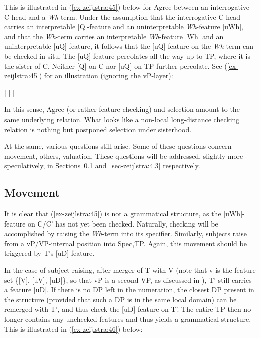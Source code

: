 \documentclass[output=paper
,modfonts
,nonflat]{langsci/langscibook}
\begin{document}
This is illustrated in (\ref{ex-zeijlstra:45}) below for Agree between an interrogative C-head and a \textit{Wh}{}-term. Under the assumption that the interrogative C-head carries an interpretable [Q]-feature and an uninterpretable \textit{Wh}-feature [uWh], and that the \textit{Wh}{}-term carries an interpretable \textit{Wh}-feature [Wh] and an uninterpretable [uQ]-feature, it follows that the [uQ]-feature on the \textit{Wh}-term can be checked in situ. The [uQ]-feature percolates all the way up to TP, where it is the sister of C. Neither [Q] on C nor [uQ] on TP further percolate. See (\ref{ex-zeijlstra:45}) for an illustration (ignoring the vP-layer):

\begin{exe}
\ex\label{ex-zeijlstra:45}\small
		\begin{forest}
		       [C{'}{=}\{{[}C{]}{,} {[}uWh{]}\},baseline
				[C{=}\{{[}C{]}{,} {[}Q{]}{,} {[}uT{]}{,}  {[}uWh{]}\}]
				[TP{=}\{{[}T{]}{,} {[}uQ{]}\}
				[DP{=}\{{[}D{]}\}]
				[T{'}{=}\{{[}T{]}{,} {[}uD{]}{,} {[}uQ{]}\}
				[T{'}{=}\{{[}T{]}{,} {[}uV{]}{,} {[}uD{]}\}]
				[VP{=}\{{[}V{]}{,} {[}uQ{]}\}
				[...V{=}\{{[}V{]}{,} {[}uD{]}\} \hspace{1cm} DP{=}\{{[}D: Wh{]}{,} {[}uQ{]}\}, roof]
				] ] ] ] 
		\end{forest}
\end{exe}
\noindent In this sense, Agree (or rather feature checking) and selection amount to the same underlying relation. What looks like a non-local long-distance checking relation is nothing but postponed selection under sisterhood.

At the same, various questions still arise. Some of these questions concern movement, others, valuation. These questions will be addressed, slightly more speculatively, in Sections~\ref{sec-zeijlstra:4.2} and~\ref{sec-zeijlstra:4.3} respectively.

\subsection{Movement} \label{sec-zeijlstra:4.2}
It is clear that (\ref{ex-zeijlstra:45}) is not a grammatical structure, as the [uWh]-feature on C/C’ has not yet been checked. Naturally, checking will be accomplished by raising the \textit{Wh}-term into its specifier. Similarly, subjects raise from a vP/VP-internal position into Spec,TP. Again, this movement should be triggered by T’s [uD]-feature. 

In the case of subject raising, after merger of T with V (note that v is the feature set \{[V], [uV], [uD]\}, so that vP is a second VP, as discussed in ), T’ still carries a feature [uD]. If there is no DP left in the numeration, the closest DP present in the structure (provided that such a DP is in the same local domain) can be remerged with T’, and thus check the [uD]-feature on T’. The entire TP then no longer contains any unchecked features and thus yields a grammatical structure. This is illustrated in (\ref{ex-zeijlstra:46}) below:
\end{document}
